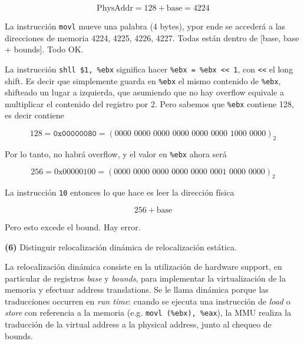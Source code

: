 \documentclass[12pt]{article}
\theoremstyle{definition}
\begin{document}
\begin{equation*}
    \text{PhysAddr} = 128 + \text{base} = 4224
\end{equation*}

La instrucción \texttt{movl} mueve una palabra (4 bytes), ypor ende se accederá
a las direcciones de memoria 4224, 4225, 4226, 4227. Todas están dentro de
[base, base + bounds]. Todo OK.

La instrucción \texttt{shll \$1, \%ebx} significa hacer \texttt{\%ebx = \%ebx <<
1}, con \texttt{<<} el long shift. Es decir que simplemente guarda en
\texttt{\%ebx} el mismo contenido de \texttt{\%ebx}, shifteado un lugar a
izquierda, que asumiendo que no hay overflow equivale a multiplicar el contenido
del registro por 2. Pero sabemos que \texttt{\%ebx} contiene 128, es decir
contiene 

\begin{equation*}
    128 = \texttt{0x00000080} = ( \text{0000 0000 0000 0000 0000 0000 1000 0000}
    )_2
\end{equation*}

Por lo tanto, no habrá overflow, y el valor en \texttt{\%ebx} ahora será 

\begin{equation*}
    \text{256} = \text{0x00000100} = ( \text{0000 0000 0000 0000 0000 0001 0000
    0000} )_2
\end{equation*}

La instrucción \texttt{10} entonces lo que hace es leer la dirección física 

\begin{equation*}
    256 + \text{base}
\end{equation*}

Pero esto excede el bound. Hay error.

\pagebreak 

\begin{shaded}
    \textbf{(6)} Distinguir relocalización dinámica de relocalización estática.
\end{shaded}

La relocalización dinámica consiste en la utilización de hardware support, en
particular de registros \textit{base} y \textit{bounds}, para implementar la
virtualización de la memoria y efectuar address translations. Se le llama
dinámica porque las traducciones occurren en \textit{run time}: cuando se
ejecuta una instrucción de \textit{load} o \textit{store} con referencia a la
memoria (e.g. \texttt{movl (\%ebx), \%eax}), la MMU realiza la traducción de la
virtual address a la physical address, junto al chequeo de bounds.
\end{document}

